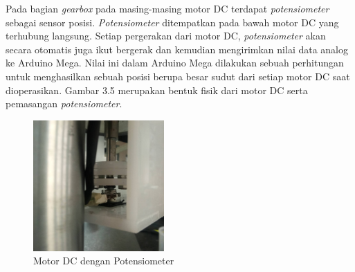 	\begin{table}[H]
	\centering
	\caption{Spesifikasi Motor DC pada Robot SCARA}
\end{table}
Pada bagian \textit{gearbox} pada masing-masing motor DC terdapat \textit{potensiometer} sebagai sensor posisi. \textit{Potensiometer} ditempatkan pada bawah motor DC yang terhubung langsung. Setiap pergerakan dari motor DC, \textit{potensiometer} akan secara otomatis juga ikut bergerak dan kemudian mengirimkan nilai data analog ke Arduino Mega. Nilai ini dalam Arduino Mega dilakukan sebuah perhitungan untuk menghasilkan sebuah posisi berupa besar sudut dari setiap motor DC saat dioperasikan. Gambar 3.5 merupakan bentuk fisik dari motor DC serta pemasangan \textit{potensiometer}.
\begin{figure}[H]
	\centering
	\includegraphics[width=5cm]{gambar/potsementara.jpg}
	\caption{Motor DC dengan Potensiometer}
\end{figure}

